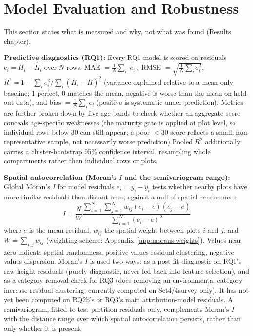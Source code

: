 \documentclass[logo,msc,ai]{infthesis}           %
\begin{document}

\section{Model Evaluation and Robustness}
\label{sec:eval-diagnostics}
This section states what is measured and why, not what was found (Results chapter).

\textbf{Predictive diagnostics (RQ1): }
Every RQ1 model is scored on residuals $e_i = H_i - \hat H_i$ over $N$ rows: MAE $=\frac{1}{N}\sum_i|e_i|$, RMSE $=\sqrt{\frac{1}{N}\sum_i e_i^2}$, $R^2 = 1-\sum_i e_i^2/\sum_i(H_i-\bar H)^2$ (variance explained relative to a mean-only baseline; 1 perfect, 0 matches the mean, negative is worse than the mean on held-out data), and bias $=\frac{1}{N}\sum_i e_i$ (positive is systematic under-prediction). Metrics are further broken down by five age bands to check whether an aggregate score conceals age-specific weaknesses (the maturity gate is applied at plot level, so individual rows below 30 can still appear; a poor $<30$ score reflects a small, non-representative sample, not necessarily worse prediction) %
Pooled $R^2$ additionally carries a cluster-bootstrap 95\% confidence interval, resampling whole compartments rather than individual rows or plots.

\textbf{Spatial autocorrelation (Moran's $I$ and the semivariogram range):}
Global Moran's $I$ for model residuals $e_i = y_i - \hat y_i$ tests whether nearby plots have more similar residuals than distant ones, against a null of spatial randomness:
\begin{equation}
    I = \frac{N}{W} \frac{\sum_{i=1}^{N} \sum_{j=1}^{N} w_{ij} (e_i - \bar{e})(e_j - \bar{e})}{\sum_{i=1}^{N} (e_i - \bar{e})^2}
    \label{eq:morans_i}
\end{equation}
where $\bar e$ is the mean residual, $w_{ij}$ the spatial weight between plots $i$ and $j$, and $W=\sum_{i,j} w_{ij}$ (weighting scheme: Appendix~\ref{app:morans-weights}). Values near zero indicate spatial randomness, positive values residual clustering, negative values dispersion. Moran's $I$ is used two ways: as a post-fit diagnostic on RQ1's raw-height residuals (purely diagnostic, never fed back into feature selection), and as a category-removal check for RQ3 (does removing an environmental category increase residual clustering, currently computed on Set4/4survey only). It has not yet been computed on RQ2b's or RQ3's main attribution-model residuals. %
A semivariogram, fitted to test-partition residuals only, complements Moran's $I$ with the distance range over which spatial autocorrelation persists, rather than only whether it is present.
\end{document}
